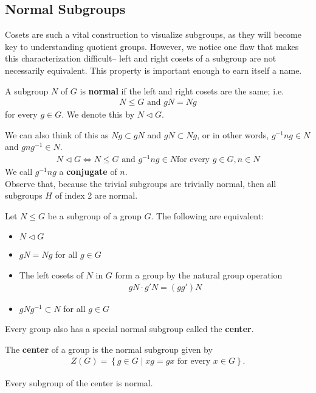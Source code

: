\documentclass{memoir}
\begin{document}
\subsection{Normal Subgroups}
\label{sec:normal_subgroups}

Cosets are such a vital construction to visualize subgroups, as they will become key to understanding quotient groups. However, we notice one flaw that makes this characterization difficult-- left and right cosets of a subgroup are not necessarily equivalent. This property is important enough to earn itself a name.

\begin{defn}
	A subgroup \(N\) of \(G\) is \textbf{normal} if the left and right cosets are the same; i.e.
\begin{align*}
	N\leq G \text{ and }gN = Ng
\end{align*}
for every \(g \in G\). We denote this by \(N \triangleleft G\).
\end{defn}
We can also think of this as \(Ng \subset gN\) and \(gN \subset Ng\), or in other words, \(g^{-1}ng \in N\) and \(gng^{-1} \in N\).
\begin{align*}
	N \triangleleft G \iff N \leq G \text{ and } g^{-1}ng \in N \text{for every }g \in G, n \in N
\end{align*}
We call \(g^{-1}ng\) a \textbf{conjugate} of \(n\).\\

Observe that, because the trivial subgroups are trivially normal, then all subgroups \(H\) of index 2 are normal.

\begin{thm}
	Let \(N \leq G\) be a subgroup of a group \(G\). The following are equivalent:
	\begin{itemize}
		\item \(N \triangleleft G\) 
		\item \(gN = Ng\) for all \(g \in G\) 
		\item The left cosets of \(N\) in \(G\) form a group by the natural group operation
			\begin{align*}
				gN \cdot g'N = (gg')N
			\end{align*}
		\item \(gNg^{-1} \subset N\) for all \(g \in G\)
	\end{itemize}
\end{thm}

Every group also has a special normal subgroup called the \textbf{center}.

\begin{defn}[Center]
	The \textbf{center} of a group is the normal subgroup given by
\begin{align*}
	Z(G) = \left\{g \in G \mid xg = gx \text{ for every }x \in G \right\} .
\end{align*}
\end{defn}
Every subgroup of the center is normal.
\end{document}
